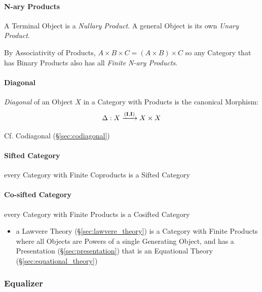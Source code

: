 \paragraph{N-ary Products}\label{sec:category_nary}\hfill
A Terminal Object is a \emph{Nullary Product}. A general Object is its
own \emph{Unary Product}.

By Associativity of Products, $A \times B \times C = (A \times B)
\times C$ so any Category that has Binary Products also has all
\emph{Finite N-ary Products}.



\paragraph{Diagonal}\label{sec:diagonal}\hfill

\emph{Diagonal} of an Object $X$ in a Category with Products is the
canonical Morphism:
\[
  \Delta : X \xrightarrow{(\mathbf{I},\mathbf{I})} X \times X
\]

\fist Cf. Codiagonal (\S\ref{sec:codiagonal})



\paragraph{Sifted Category}\label{sec:sifted_category}\hfill

every Category with Finite Coproducts is a Sifted Category



\paragraph{Co-sifted Category}\label{sec:cosifted_category}\hfill

every Category with Finite Products is a Cosifted Category

\begin{itemize}
  \item a Lawvere Theory (\S\ref{sec:lawvere_theory}) is a Category with Finite
    Products where all Objects are Powers of a single Generating Object, and has
    a Presentation (\S\ref{sec:presentation}) that is an Equational Theory
    (\S\ref{sec:equational_theory})
\end{itemize}



\subsubsection{Equalizer}\label{sec:equalizer}

